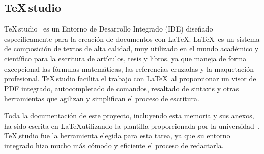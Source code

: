 \subsection{\TeX\,studio}


\TeX\,studio~\cite{texstudio} es un Entorno de Desarrollo Integrado (IDE) diseñado específicamente para la creación de documentos con \LaTeX. \LaTeX\ es un sistema de composición de textos de alta calidad, muy utilizado en el mundo académico y científico para la escritura de artículos, tesis y libros, ya que maneja de forma excepcional las fórmulas matemáticas, las referencias cruzadas y la maquetación profesional. \TeX\,studio facilita el trabajo con \LaTeX\ al proporcionar un visor de PDF integrado, autocompletado de comandos, resaltado de sintaxis y otras herramientas que agilizan y simplifican el proceso de escritura.

Toda la documentación de este proyecto, incluyendo esta memoria y sus anexos, ha sido escrita en \LaTeX utilizando la plantilla proporcionada por la universidad~\cite{UBU2024ubutfgm}. \TeX,studio fue la herramienta elegida para esta tarea, ya que su entorno integrado hizo mucho más cómodo y eficiente el proceso de redactarla.
